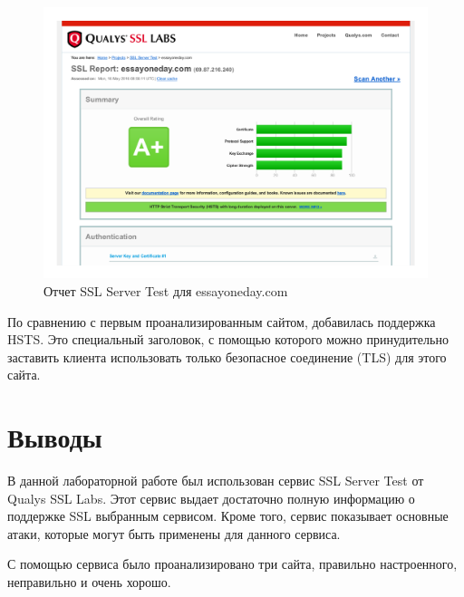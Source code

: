\begin{figure}[H]
	\centering
	\includegraphics[width=\textwidth]{images/3.png}
	\caption{Отчет SSL Server Test для essayoneday.com}
\end{figure}

По сравнению с первым проанализированным сайтом, добавилась поддержка HSTS. Это специальный заголовок, с помощью которого можно принудительно заставить клиента использовать только безопасное соединение (TLS) для этого сайта.

\section{Выводы}
В данной лабораторной работе был использован сервис SSL Server Test от Qualys SSL Labs. Этот сервис выдает достаточно полную информацию о поддержке SSL выбранным сервисом. Кроме того, сервис показывает основные атаки, которые могут быть применены для данного сервиса.

С помощью сервиса было проанализировано три сайта, правильно настроенного, неправильно и очень хорошо.